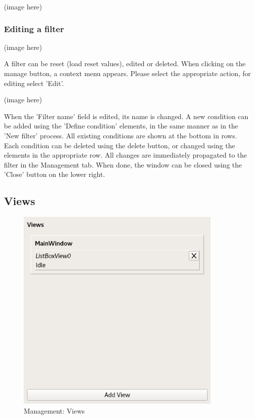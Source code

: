 \documentclass[10pt,letterpaper,extrafontsizes]{memoir}
\begin{document}
(image here)

\subsubsection{Editing a filter}
\label{sec:filter_editing}

(image here)

A filter can be reset (load reset values), edited or deleted.  When clicking on the manage button, a context menu appears. Please select the appropriate action, for editing select 'Edit'.

(image here)

When the 'Filter name' field is edited, its name is changed.  A new condition can be added using the
'Define condition' elements, in the same manner as in the 'New filter' process. All existing conditions are
shown at the bottom in rows.  Each condition can be deleted using the delete button, or changed using the elements in the appropriate row.
All changes are immediately propagated to the filter in the Management tab.  When done, the window
can be closed using the 'Close' button on the lower right.


\subsection{Views}

\begin{figure}[H]
  \center
    \includegraphics[width=10cm]{../screenshots/management_views.png}
  \caption{Management: Views}
  \label{fig:management_views}
\end{figure}
\end{document}
